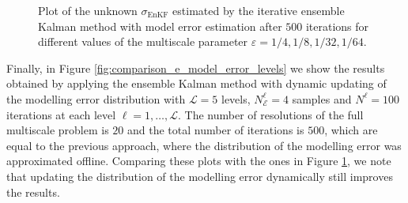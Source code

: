 \documentclass[10pt]{article}
\begin{document}
\begin{figure}[t]
\caption{Plot of the unknown $\sigma_{\mathrm{EnKF}}$ estimated by the iterative ensemble Kalman method with model error estimation after $500$ iterations for different values of the multiscale parameter $\varepsilon = 1/4, 1/8, 1/32, 1/64$.}
\label{fig:comparison_e_model_error}
\end{figure}

Finally, in Figure \ref{fig:comparison_e_model_error_levels} we show the results obtained by applying the ensemble Kalman method with dynamic updating of the modelling error distribution with $\mathcal{L} = 5$ levels, $N_{\mathcal{E}}^{\ell} = 4$ samples and $N^{\ell} = 100$ iterations at each level $\ell = 1, \dots, \mathcal{L}$. The number of resolutions of the full multiscale problem is $20$ and the total number of iterations is $500$, which are equal to the previous approach, where the distribution of the modelling error was approximated offline. Comparing these plots with the ones in Figure \ref{fig:comparison_e_model_error}, we note that updating the distribution of the modelling error dynamically still improves the results.
\end{document}
